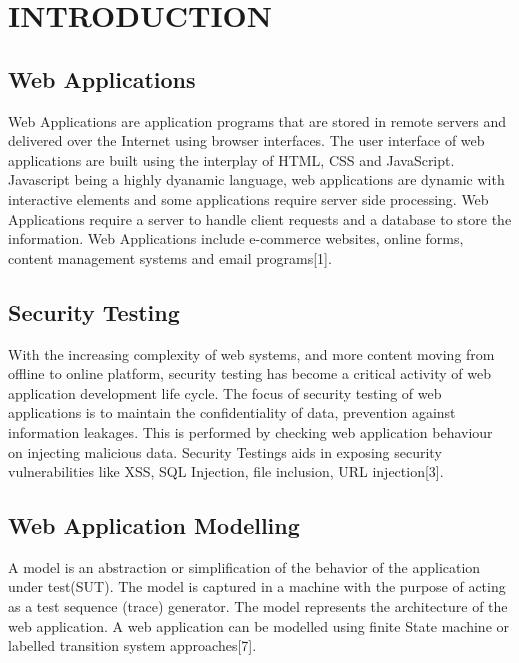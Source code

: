 
\chapter{INTRODUCTION}
\label{chap:intro}

\section{Web Applications}
Web Applications are application programs that are stored in remote servers and delivered over the Internet using browser interfaces. The user interface of web applications are built using the interplay of HTML, CSS and JavaScript. Javascript being a highly dyanamic language, web applications are dynamic with interactive elements and some applications require server side processing. Web Applications require a server to handle client requests and a database to store the information. Web Applications include e-commerce websites, online forms, content management systems and email programs[1]. 

\section{Security Testing}
With the increasing complexity of web systems, and more content moving from offline to online platform, security testing has become a critical activity of web application development life cycle. The focus of security testing of web applications is to maintain the confidentiality of data, prevention against information leakages. This is performed by checking web application behaviour on injecting malicious data. Security Testings aids in exposing security vulnerabilities like XSS, SQL Injection, file inclusion, URL injection[3]. 

\section{Web Application Modelling}
A model is an abstraction or simplification of the behavior of the application under test(SUT). The model is captured in a machine with the purpose of acting as a test sequence (trace) generator. The model represents the architecture of the web application. A web application can be modelled using finite State machine or labelled transition system approaches[7]. 

